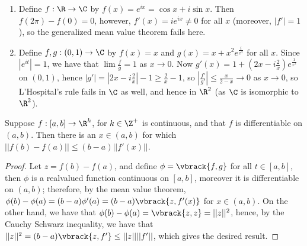 \begin{example}
    \begin{enumerate}[label=(\arabic*)]
        \item Define $f:\R \rightarrow \C$ by $f(x)=e^{ix}=\cos{x}+i\sin{x}$. Then $f(2\pi)-f(0)=0$, 
            however, $f'(x)=ie^{ix} \neq 0$ for all $x$ (moreover, $|f'|=1$), so the 
            generalized mean value theorem fails here.

        \item Define $f,g:(0,1) \rightarrow \C$ by  $f(x)=x$ and $g(x)=x+x^2e^{\frac{i}{x^2}}$ 
            for all $x$. Since $|e^{it}|=1$, we have that $\lim{\frac{f}{g}}=1$ as $x \rightarrow 0$. 
            Now  $g'(x)=1+(2x-i\frac{2}{x})e^{\frac{1}{x^2}}$ on $(0,1)$, hence  $|g'|=
            |2x-i\frac{2}{x}|-1 \geq \frac{2}{x}-1$, so $|\frac{f'}{g'}| \leq \frac{x}{2-x} \rightarrow 0$ 
            as $x \rightarrow 0$, so L'Hospital's rule fails in  $\C$ as well, and hence in  $\R^2$  
            (as $\C$ is isomorphic to  $\R^2$).
    \end{enumerate}
\end{example} 

\begin{theorem}\label{6.6.1}
    Suppose $f:[a,b] \rightarrow \R^k$, for  $k \in \Z^+$ is continuous, and that $f$ is 
    differentiable on  $(a,b)$. Then there is an  $x \in (a,b)$ for which $||f(b)-f(a)|| \leq (b-a)||f'(x)||$.
\end{theorem}
\begin{proof}
    Let $z=f(b)-f(a)$, and define  $\phi=\vbrack{f,g}$ for all  $t \in [a,b]$, then $\phi$ 
    is a realvalued function continuous on $[a,b]$, moreover it is differentiable on  $(a,b)$; therefore, 
    by the mean value theorem,  $\phi(b)-\phi(a)=(b-a)\phi'(a)=(b-a)\vbrack{z,f'(x)}$ for  $x \in  (a,b)$. 
    On the other hand, we have that $\phi(b)-\phi(a)=\vbrack{z,z}=||z||^2$, hence, by the Cauchy 
    Schwarz inequality, we have that $||z||^2=(b-a)\vbrack{z,f'} \leq ||z||||f'||$,  which gives 
    the desired result.
\end{proof}
